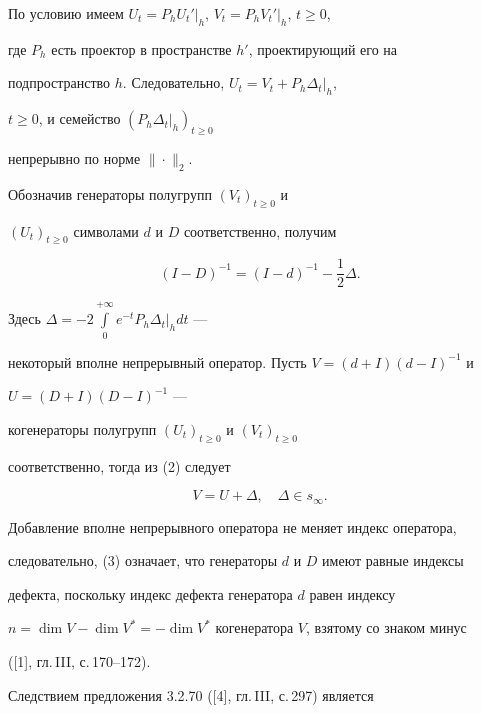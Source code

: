 \begin{pf}


По условию имеем $U_t=P_{h}U_t'|_{h}$, $V_t=P_{h}V_t'|_{h}$, $t\geq 0$,


где $P_{h}$ есть проектор в пространстве $h'$, проектирующий его на


подпространство $h$. Следовательно, $U_t=V_t+P_{h}\Delta_t|_{h}$,


$t\geq 0$, и семейство $(P_{h}\Delta_t|_{h})_{t\geq 0}$


непрерывно по норме $\|\cdot \|_2$.


Обозначив генераторы полугрупп $(V_t)_{t\geq 0}$ и


$(U_t)_{t\geq 0}$ символами $d$ и $D$ соответственно, получим


\begin{equation}


(I-D)^{-1}=(I-d)^{-1}-\frac {1}{2}\Delta .


\end{equation}


Здесь $\Delta=-2\int\limits_{0}^{+\infty}e^{-t}P_{h}\Delta_t|_{h}dt$ ---


некоторый вполне непрерывный оператор. Пусть $V=(d+I)(d-I)^{-1}$ и


$U=(D+I)(D-I)^{-1}$ ---


когенераторы полугрупп $(U_t)_{t\geq 0}$ и $(V_t)_{t\geq 0}$


соответственно, тогда из (2) следует


\begin{equation}


V=U+\Delta,\quad \Delta \in s_{\infty}.


\end{equation}


Добавление вполне непрерывного оператора не меняет индекс оператора,


следовательно, (3) означает, что генераторы $d$ и $D$ имеют равные индексы


дефекта, поскольку индекс дефекта генератора $d$ равен индексу


$n=\dim V-\dim V^*=-\dim V^*$ когенератора $V$, взятому со знаком минус


([1], гл.\,III, с.\,170--172).


\end{pf}





Следствием предложения 3.2.70 ([4], гл.\,III, с.\,297) является





